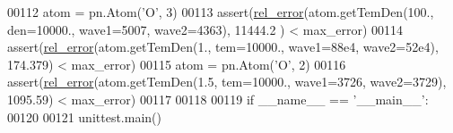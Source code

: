 \begin{DoxyCode}
00112                 atom = pn.Atom(\textcolor{stringliteral}{'O'}, 3)
00113                 assert(\hyperlink{namespacepyneb_1_1test_1_1unit_test_aff3b7f847905c444d8b10727f10de236}{rel\_error}(atom.getTemDen(100., den=10000., wave1=5007, wave2=4363), 11444.2
      ) < max\_error)
00114                 assert(\hyperlink{namespacepyneb_1_1test_1_1unit_test_aff3b7f847905c444d8b10727f10de236}{rel\_error}(atom.getTemDen(1., tem=10000., wave1=88e4, wave2=52e4), 174.379) 
      < max\_error)
00115                 atom = pn.Atom(\textcolor{stringliteral}{'O'}, 2)
00116                 assert(\hyperlink{namespacepyneb_1_1test_1_1unit_test_aff3b7f847905c444d8b10727f10de236}{rel\_error}(atom.getTemDen(1.5, tem=10000., wave1=3726, wave2=3729), 1095.59)
       < max\_error)
00117 
00118 
00119 \textcolor{keywordflow}{if} \_\_name\_\_ == \textcolor{stringliteral}{'\_\_main\_\_'}:
00120 
00121         unittest.main()
\end{DoxyCode}
